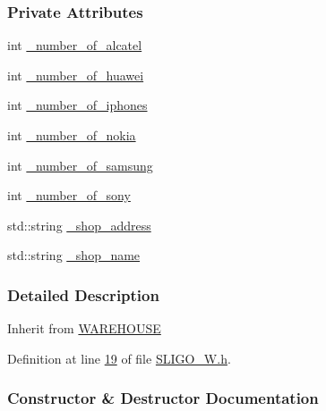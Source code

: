 \subsubsection*{Private Attributes}
\begin{DoxyCompactItemize}
\item 
int \hyperlink{class_s_l_i_g_o___w_acbf32331901a3fc710c5c97d286b6fcf_acbf32331901a3fc710c5c97d286b6fcf}{\+\_\+number\+\_\+of\+\_\+alcatel}
\item 
int \hyperlink{class_s_l_i_g_o___w_af9ca2fb509b7b8ca9f1860ece827501f_af9ca2fb509b7b8ca9f1860ece827501f}{\+\_\+number\+\_\+of\+\_\+huawei}
\item 
int \hyperlink{class_s_l_i_g_o___w_aa958eed564796bb349d15bf2b2e3208d_aa958eed564796bb349d15bf2b2e3208d}{\+\_\+number\+\_\+of\+\_\+iphones}
\item 
int \hyperlink{class_s_l_i_g_o___w_a9fe78b9365c145432d58cb947b01111a_a9fe78b9365c145432d58cb947b01111a}{\+\_\+number\+\_\+of\+\_\+nokia}
\item 
int \hyperlink{class_s_l_i_g_o___w_a2c7845560ec14452132d659eb54f2cec_a2c7845560ec14452132d659eb54f2cec}{\+\_\+number\+\_\+of\+\_\+samsung}
\item 
int \hyperlink{class_s_l_i_g_o___w_a0ccf87fe78352e1eac98ed3c85810caa_a0ccf87fe78352e1eac98ed3c85810caa}{\+\_\+number\+\_\+of\+\_\+sony}
\item 
std\+::string \hyperlink{class_s_l_i_g_o___w_ade08b79101c67997dde54515f2088b9d_ade08b79101c67997dde54515f2088b9d}{\+\_\+shop\+\_\+address}
\item 
std\+::string \hyperlink{class_s_l_i_g_o___w_a01bebef43ff4b4d9d728489f05b94d86_a01bebef43ff4b4d9d728489f05b94d86}{\+\_\+shop\+\_\+name}
\end{DoxyCompactItemize}


\subsubsection{Detailed Description}
Inherit from \hyperlink{class_w_a_r_e_h_o_u_s_e}{W\+A\+R\+E\+H\+O\+U\+SE} 

Definition at line \hyperlink{_s_l_i_g_o___w_8h_source_l00019}{19} of file \hyperlink{_s_l_i_g_o___w_8h_source}{S\+L\+I\+G\+O\+\_\+\+W.\+h}.



\subsubsection{Constructor \& Destructor Documentation}

